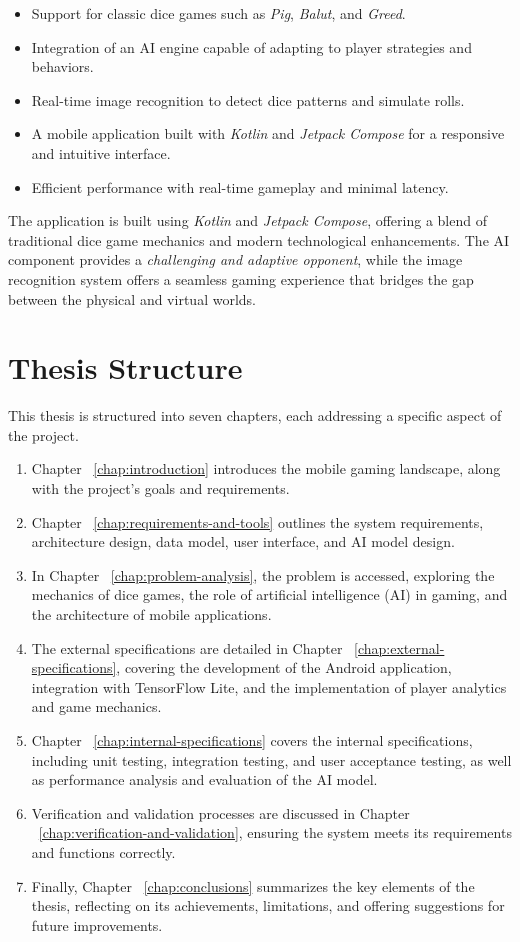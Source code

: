 \begin{itemize}
    \item Support for classic dice games such as \emph{Pig}, \emph{Balut}, and \emph{Greed}.
    \item Integration of an AI engine capable of adapting to player strategies and behaviors.
    \item Real-time image recognition to detect dice patterns and simulate rolls.
    \item A mobile application built with \emph{Kotlin} and \emph{Jetpack Compose} for a responsive and intuitive interface.
    \item Efficient performance with real-time gameplay and minimal latency.
\end{itemize}

The application is built using \emph{Kotlin} and \emph{Jetpack Compose}, offering a blend of traditional dice game mechanics and modern technological enhancements. The AI component provides a \emph{challenging and adaptive opponent}, while the image recognition system offers a seamless gaming experience that bridges the gap between the physical and virtual worlds.

\section{Thesis Structure}
This thesis is structured into seven chapters, each addressing a specific aspect of the project.

\begin{enumerate}
    \item Chapter ~\ref{chap:introduction} introduces the mobile gaming landscape, along with the project's goals and requirements.
    \item Chapter ~\ref{chap:requirements-and-tools} outlines the system requirements, architecture design, data model, user interface, and AI model design.
    \item In Chapter ~\ref{chap:problem-analysis}, the problem is accessed, exploring the mechanics of dice games, the role of artificial intelligence (AI) in gaming, and the architecture of mobile applications.
    \item The external specifications are detailed in Chapter ~\ref{chap:external-specifications}, covering the development of the Android application, integration with TensorFlow Lite, and the implementation of player analytics and game mechanics.
    \item Chapter ~\ref{chap:internal-specifications} covers the internal specifications, including unit testing, integration testing, and user acceptance testing, as well as performance analysis and evaluation of the AI model.
    \item Verification and validation processes are discussed in Chapter ~\ref{chap:verification-and-validation}, ensuring the system meets its requirements and functions correctly.
    \item Finally, Chapter ~\ref{chap:conclusions} summarizes the key elements of the thesis, reflecting on its achievements, limitations, and offering suggestions for future improvements.
\end{enumerate}
